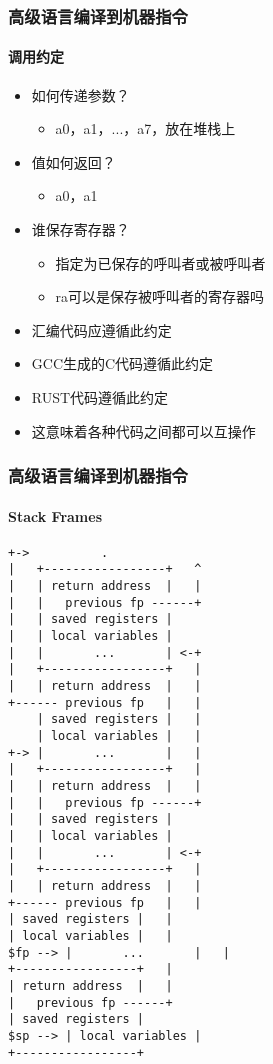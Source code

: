 \documentclass[UTF8]{ctexbeamer}
\begin{document}
\begin{frame}
	\frametitle{高级语言编译到机器指令}
\framesubtitle{调用约定}
	
 \begin{itemize}
	\item 如何传递参数？
	\begin{itemize}
	 	\item a0，a1，...，a7，放在堆栈上
	\end{itemize}
	\item 值如何返回？
	\begin{itemize}
		\item a0，a1
	\end{itemize}	
	\item 谁保存寄存器？
	\begin{itemize}
		\item 指定为已保存的呼叫者或被呼叫者
	    \item ra可以是保存被呼叫者的寄存器吗
    \end{itemize}   
	
	\item 汇编代码应遵循此约定
	\item GCC生成的C代码遵循此约定
	\item RUST代码遵循此约定
	\item 这意味着各种代码之间都可以互操作

\end{itemize} 
	
\end{frame}


\begin{frame}[fragile]
	\frametitle{高级语言编译到机器指令}
	\framesubtitle{Stack Frames}

\begin{lstlisting}
+->          .
|   +-----------------+   ^
|   | return address  |   |
|   |   previous fp ------+
|   | saved registers |
|   | local variables |
|   |       ...       | <-+
|   +-----------------+   |
|   | return address  |   |
+------ previous fp   |   |
    | saved registers |   |
    | local variables |   |
+-> |       ...       |   |
|   +-----------------+   |
|   | return address  |   |
|   |   previous fp ------+
|   | saved registers |
|   | local variables |
|   |       ...       | <-+
|   +-----------------+   |
|   | return address  |   |
+------ previous fp   |   |
| saved registers |   |
| local variables |   |
$fp --> |       ...       |   |
+-----------------+   |
| return address  |   |
|   previous fp ------+
| saved registers |
$sp --> | local variables |
+-----------------+
\end{lstlisting}	
	
	
\end{frame}

\end{document}
